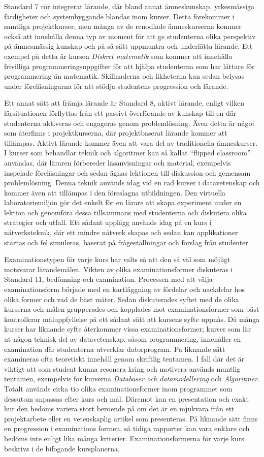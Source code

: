 Standard 7 rör integrerat lärande, där bland annat ämneskunskap, yrkesmässiga färdigheter och systembyggande blandas inom kurser. Detta förekommer i samtliga projektkurser, men många av de renodlade ämneskurserna kommer också att innehålla denna typ av moment för att ge studenterna olika perspektiv på ämnesmässig kunskap och på så sätt uppmuntra och underlätta lärande. Ett exempel på detta är kursen \emph{Diskret matematik} som kommer att innehålla frivilliga programmeringsuppgifter för att hjälpa studenterna som har lättare för programmering än matematik. Skillnaderna och likheterna kan sedan belysas under föreläsningarna för att stödja studentens progression och lärande.

Ett annat sätt att främja lärande är Standard 8, aktivt lärande, enligt vilken lärsituationen förflyttas från ett passivt överförande av kunskap till en där studenterna aktiveras och engageras genom problemlösning. Även detta är något som återfinns i projektkurserna, där projektbaserat lärande kommer att tillämpas. Aktivt lärande kommer även att vara del av traditionella ämneskurser. I kurser som behandlar teknik och algoritmer kan så kallat ``flipped classroom'' användas, där läraren förbereder läsanvisningar och material, exempelvis inspelade föreläsningar och sedan ägnas lektionen till diskussion och gemensam problemlösning. Denna teknik används idag vid en rad kurser i datavetenskap och kommer även att tillämpas i den föreslagna utbildningen. Den virtuella laboratoriemiljön gör det enkelt för en lärare att skapa experiment under en lektion och genomföra dessa tillsammans med studenterna och diskutera olika strategier och utfall. Ett sådant upplägg används idag på en kurs i nätverksteknik, där ett mindre nätverk skapas och sedan kan applikationer startas och fel simuleras, baserat på frågeställningar och förslag från studenter.

Examinationstypen för varje kurs har valts så att den så väl som möjligt motsvarar lärandemålen. Vikten av olika examinationsformer diskuteras i Standard 11, bedömning och examination. Processen med att välja examinationsform började med en kartläggning av fördelar och nackdelar hos olika former och vad de bäst mäter. Sedan diskuterades syftet med de olika kurserna och målen grupperades och kopplades mot examinationsformer som bäst kontrollerar måluppfyllelse på ett sådant sätt att kursens syfte uppnås. Då många kurser har liknande syfte återkommer vissa examinationsformer; kurser som lär ut någon teknisk del av datavetenskap, såsom programmering, innehåller en examination där studenterna utvecklar datorprogram. På liknande sätt examineras ofta teoretiskt innehåll genom skriftlig tentamen. I fall där det är viktigt att som student kunna resonera kring och motivera används muntlig tentamen, exempelvis för kurserna \emph{Databaser och datamodellering} och \emph{Algoritmer}. Totalt används cirka tio olika examinationsformer inom programmet som dessutom anpassas efter kurs och mål. Däremot kan en presentation och exakt hur den bedöms variera stort beroende på om det är en mjukvara från ett projektarbete eller en vetenskaplig artikel som presenteras. På liknande sätt finns en progression i examinations formen, så tidiga rapporter kan vara enklare och bedöms inte enligt lika många kriterier. Examinationsformerna för varje kurs beskrivs i de bifogande kursplanerna.